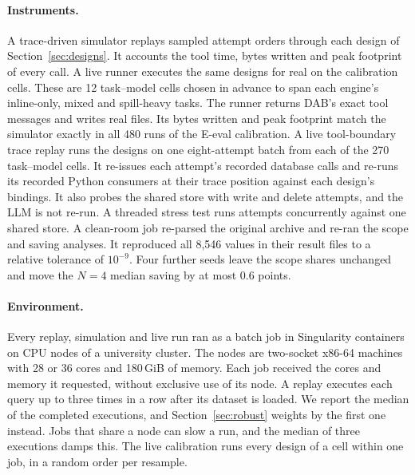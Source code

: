 \paragraph{Instruments.}
A trace-driven simulator replays sampled attempt orders through each design of Section~\ref{sec:designs}. It accounts
the tool time, bytes written and peak footprint of every call. A live runner executes the same designs for real on
the calibration cells. These are 12 task--model cells chosen in advance to span each engine's inline-only, mixed and
spill-heavy tasks. The runner returns DAB's exact tool messages and writes real files. Its bytes written and peak
footprint match the simulator exactly in all 480 runs of the E-eval calibration. A live tool-boundary trace replay
runs the designs on one eight-attempt batch from each of the 270 task--model cells. It re-issues each attempt's
recorded database calls and re-runs its recorded Python consumers at their trace position against each design's
bindings. It also probes the shared store with write and delete attempts, and the LLM is not re-run. A threaded
stress test runs attempts concurrently against one shared store. A clean-room job re-parsed the original archive and
re-ran the scope and saving analyses. It reproduced all 8,546 values in their result files to a relative tolerance of
$10^{-9}$. Four further seeds leave the scope shares unchanged and move the $N=4$ median saving by at most 0.6 points.

\paragraph{Environment.}
Every replay, simulation and live run ran as a batch job in Singularity containers on CPU nodes of a university
cluster. The nodes are two-socket x86-64 machines with 28 or 36 cores and 180\,GiB of memory. Each job received the
cores and memory it requested, without exclusive use of its node. A replay executes each query up to three times in
a row after its dataset is loaded. We report the median of the completed executions, and Section~\ref{sec:robust}
weights by the first one instead. Jobs that share a node can slow a run, and the median of three executions damps
this. The live calibration runs every design of a cell within one job, in a random order per resample.

